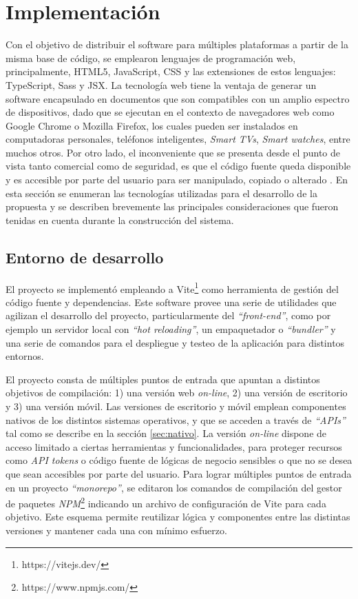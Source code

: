 \section{Implementación} \label{sec:software}

Con el objetivo de distribuir el software para múltiples plataformas a partir de la misma base de código, se emplearon lenguajes de programación web, principalmente, HTML5, JavaScript, CSS y las extensiones de estos lenguajes: TypeScript, Sass y JSX. La tecnología web tiene la ventaja de generar un software encapsulado en documentos que son compatibles con un amplio espectro de dispositivos, dado que se ejecutan en el contexto de navegadores web como Google Chrome o Mozilla Firefox, los cuales pueden ser instalados en computadoras personales, teléfonos inteligentes, \textit{Smart TVs}, \textit{Smart watches}, entre muchos otros. Por otro lado, el inconveniente que se presenta desde el punto de vista tanto comercial como de seguridad, es que el código fuente queda disponible y es accesible por parte del usuario para ser manipulado, copiado o alterado \cite{jazayeri}. En esta sección se enumeran las tecnologías utilizadas para el desarrollo de la propuesta y se describen brevemente las principales consideraciones que fueron tenidas en cuenta durante la construcción del sistema.

\subsection{Entorno de desarrollo}
El proyecto se implementó empleando a Vite\footnote{https://vitejs.dev/} como herramienta de gestión del código fuente y dependencias. Este software provee una serie de utilidades que agilizan el desarrollo del proyecto, particularmente del \textit{``front-end''}, como por ejemplo un servidor local con \textit{``hot reloading''}, un empaquetador o \textit{``bundler''} y una serie de comandos para el despliegue y testeo de la aplicación para distintos entornos.

El proyecto consta de múltiples puntos de entrada que apuntan a distintos objetivos de compilación: 1) una versión web \textit{on-line}, 2) una versión de escritorio y 3) una versión móvil. Las versiones de escritorio y móvil emplean componentes nativos de los distintos sistemas operativos, y que se acceden a través de \textit{``APIs''} tal como se describe en la sección \ref{sec:nativo}. La versión \textit{on-line} dispone de acceso limitado a ciertas herramientas y funcionalidades, para proteger recursos como \textit{API tokens} o código fuente de lógicas de negocio sensibles o que no se desea que sean accesibles por parte del usuario. Para lograr múltiples puntos de entrada en un proyecto \textit{``monorepo''}, se editaron los comandos de compilación del gestor de paquetes \textit{NPM}\footnote{https://www.npmjs.com/} indicando un archivo de configuración de Vite para cada objetivo. Este esquema permite reutilizar lógica y componentes entre las distintas versiones y mantener cada una con mínimo esfuerzo.

